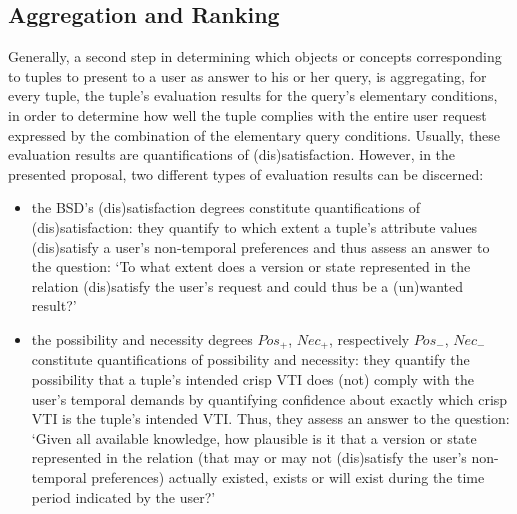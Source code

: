 \documentclass[runningheads,a4paper]{llncs}
\begin{document}
\subsection{Aggregation and Ranking}
Generally, a second step in determining which objects or concepts corresponding to tuples to present to a user as answer to his or her query, is aggregating, for every tuple, the tuple's evaluation results for the query's elementary conditions, in order to determine how well the tuple complies with the entire user request expressed by the combination of the elementary query conditions. Usually, these evaluation results are quantifications of (dis)satisfaction. However, in the presented proposal, two different types of evaluation results can be discerned:

\begin{itemize}
	\item the BSD's (dis)satisfaction degrees constitute quantifications of (dis)satisfaction: they quantify to which extent a tuple's attribute values (dis)satisfy a user's non-temporal preferences and thus assess an answer to the question: `To what extent does a version or state represented in the relation (dis)satisfy the user's request and could thus be a (un)wanted result?'
	\item the possibility and necessity degrees $Pos_{+}$, $Nec_{+}$, respectively $Pos_{-}$, $Nec_{-}$ constitute quantifications of possibility and necessity: they quantify the possibility that a tuple's intended crisp VTI does (not) comply with the user's temporal demands by quantifying confidence about exactly which crisp VTI is the tuple's intended VTI. Thus, they assess an answer to the question: `Given all available knowledge, how plausible is it that a version or state represented in the relation (that may or may not (dis)satisfy the user's non-temporal preferences) actually existed, exists or will exist during the time period indicated by the user?'
\end{itemize}
\end{document}
